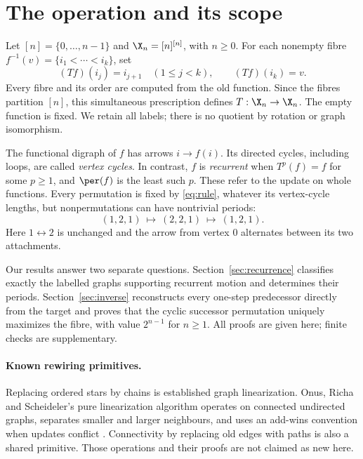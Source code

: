 \section{The operation and its scope}

Let $[n]=\{0,\ldots,n-1\}$ and $\X_n=[n]^{[n]}$, with $n\ge0$.
For each nonempty fibre $f^{-1}(v)=\{i_1<\cdots<i_k\}$, set
\begin{equation}\label{eq:rule}
 (Tf)(i_j)=i_{j+1}\quad(1\le j<k),
 \qquad (Tf)(i_k)=v.
\end{equation}
Every fibre and its order are computed from the old function. Since the
fibres partition $[n]$, this simultaneous prescription defines
$T:\X_n\to\X_n$. The empty function is fixed. We retain all labels;
there is no quotient by rotation or graph isomorphism.

The functional digraph of $f$ has arrows $i\to f(i)$. Its directed
cycles, including loops, are called \emph{vertex cycles}. In contrast,
$f$ is \emph{recurrent} when $T^p(f)=f$ for some $p\ge1$, and
$\per(f)$ is the least such $p$. These refer to the update on whole
functions. Every permutation is fixed by \eqref{eq:rule}, whatever its
vertex-cycle lengths, but nonpermutations can have nontrivial periods:
\begin{equation}\label{eq:two-cycle}
 (1,2,1)\ \longmapsto\ (2,2,1)\ \longmapsto\ (1,2,1).
\end{equation}
Here $1\leftrightarrow2$ is unchanged and the arrow from vertex $0$
alternates between its two attachments.

Our results answer two separate questions. Section~\ref{sec:recurrence}
classifies exactly the labelled graphs supporting recurrent motion and
determines their periods. Section~\ref{sec:inverse} reconstructs every
one-step predecessor directly from the target and proves that the cyclic
successor permutation uniquely maximizes the fibre, with value $2^{n-1}$
for $n\ge1$. All proofs are given here; finite checks are supplementary.

\paragraph{Known rewiring primitives.}
Replacing ordered stars by chains is established graph linearization.
Onus, Richa and Scheideler's pure linearization algorithm operates on
connected undirected graphs, separates smaller and larger neighbours, and
uses an add-wins convention when updates conflict
\citep[Algorithm~1 and Section~2]{onus2007linearization}.
Connectivity by replacing old edges with paths is also a shared primitive.
Those operations and their proofs are not claimed as new here.

